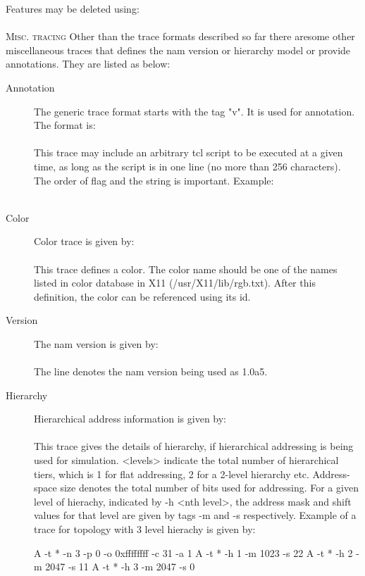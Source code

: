 Features may be deleted using:\\
\\


\textsc{Misc. tracing}
Other than the trace formats described so far there aresome other
miscellaneous traces that defines the nam version or hierarchy model or
provide annotations. They are listed as below:
 \begin{description}
\item[Annotation] The generic trace format starts with the tag "v". It is
used for annotation. The format is:\\ \\ This trace may include an arbitrary tcl script to be executed
at a given
time, as long as the script is in one line (no more than 256 characters).
The order of flag and the string is important.  Example: \\
\\

\item[Color] Color trace is given by:\\
\\
This trace defines a color. The color name should be one of the names
listed in color database in X11 (/usr/X11/lib/rgb.txt). After this
definition, the color can be referenced using its id. 

\item[Version]
The nam version is given by:\\
\\
The line  denotes the nam version being used
as 1.0a5.

\item[Hierarchy] Hierarchical address information is given by:\\
\\
This trace gives the details of hierarchy, if hierarchical addressing is
being used for simulation. <levels> indicate the total number of
hierarchical tiers, which is 1 for flat addressing, 2 for a 2-level
hierarchy etc. Address-space size denotes the total number of bits used
for addressing. For a given level of hierachy, indicated by -h <nth
level>, the
address mask and shift values for that level are given by tags -m and -s
respectively.
Example of a trace for topology with 3 level hierachy is given by:
\begin{program}
A -t * -n 3 -p 0 -o 0xffffffff -c 31 -a 1
A -t * -h 1 -m 1023 -s 22
A -t * -h 2 -m 2047 -s 11
A -t * -h 3 -m 2047 -s 0 
\end{program}
\end{description}

